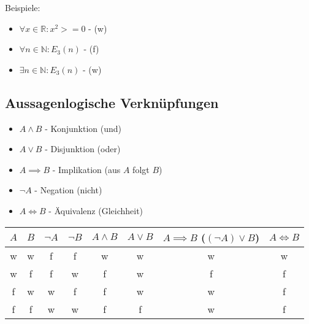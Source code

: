 \documentclass[12pt]{scrreprt}
\begin{document}
                Beispiele:
                \begin{itemize}
                    \item $ \forall x \in \mathbb{R} : x ^ 2 >= 0 $ - (w)
                    \item $ \forall n \in \mathbb{N} : E _ 3 (n) $ - (f)
                    \item $ \exists n \in \mathbb{N} : E _ 3 (n) $ - (w)
                \end{itemize}

            \subsection{Aussagenlogische Verknüpfungen}
                \label{ss:grundbegriffe_aussagen_verknuepfungen}

                \begin{itemize}
                    \item $ A \land B $ - Konjunktion (und)
                    \item $ A \lor B $ - Disjunktion (oder)
                    \item $ A \implies B $ - Implikation (aus $ A $ folgt $ B $)
                    \item $ \lnot A $ - Negation (nicht)
                    \item $ A \iff B $ - Äquivalenz (Gleichheit)
                \end{itemize}

                \begin{tabular}{ c | c | c | c | c | c | c | c}
$ A $   & $ B $ & $ \lnot A $   & $ \lnot B $   & $ A \land B $ & $ A \lor B $  & $ A \implies B $ ($ (\lnot A) \lor B $)   & $ A \iff B $  \\
\hline
w       & w     & f             & f             & w             & w             & w                                         & w             \\
w       & f     & f             & w             & f             & w             & f                                         & f             \\
f       & w     & w             & f             & f             & w             & w                                         & f             \\
f       & f     & w             & w             & f             & f             & w                                         & f             \\
                \end{tabular}
\end{document}
